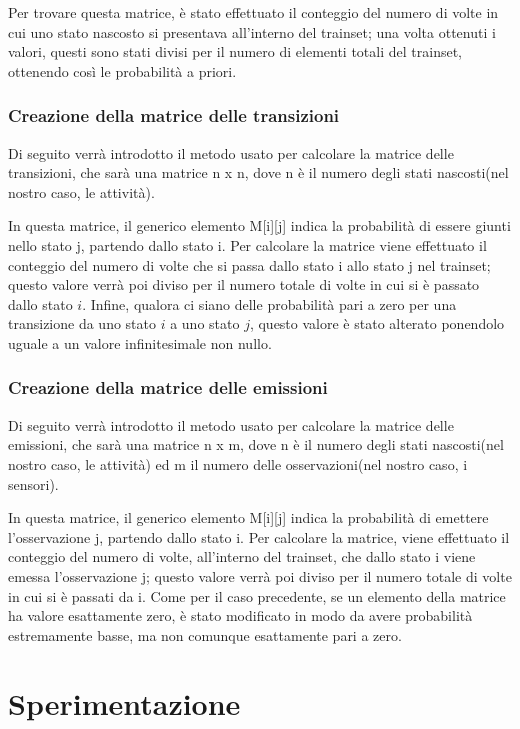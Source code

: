 \documentclass[10pt,a4paper]{article}
\begin{document}
	Per trovare questa matrice, è stato effettuato il conteggio del numero di volte in cui uno stato nascosto si presentava all'interno del trainset; una volta ottenuti i valori, questi sono stati divisi per il numero di elementi totali del trainset, ottenendo così le probabilità a priori.
	
	\subsubsection{Creazione della matrice delle transizioni}
	Di seguito verrà introdotto il metodo usato per calcolare la matrice delle transizioni, che sarà una matrice  n x n, dove n è il numero degli stati nascosti(nel nostro caso, le attività).
	
	In questa matrice, il generico elemento M[i][j] indica la probabilità di essere giunti nello stato j, partendo dallo stato i. Per calcolare la matrice viene effettuato il conteggio del numero di volte che si passa dallo stato i allo stato j nel trainset; questo valore verrà poi diviso per il numero totale di volte in cui si è passato dallo stato $i$. Infine, qualora ci siano delle probabilità pari a zero per una transizione da uno stato $i$ a uno stato $j$, questo valore è stato alterato ponendolo uguale a un valore infinitesimale non nullo.
	
	\subsubsection{Creazione della matrice delle emissioni}
	Di seguito verrà introdotto il metodo usato per calcolare la matrice delle emissioni, che sarà una matrice  n x m, dove n è il numero degli stati nascosti(nel nostro caso, le attività) ed m il numero delle osservazioni(nel nostro caso, i sensori).
	
	In questa matrice, il generico elemento M[i][j] indica la probabilità di emettere l'osservazione j, partendo dallo stato i. Per calcolare la matrice, viene effettuato il conteggio del numero di volte, all'interno del trainset, che dallo stato i viene emessa l'osservazione j; questo valore verrà poi diviso per il numero totale di volte in cui si è passati da i. Come per il caso precedente, se un elemento della matrice ha valore esattamente zero, è stato modificato in modo da avere probabilità estremamente basse, ma non comunque esattamente pari a zero.
	
	\section{Sperimentazione}
	
\end{document}
